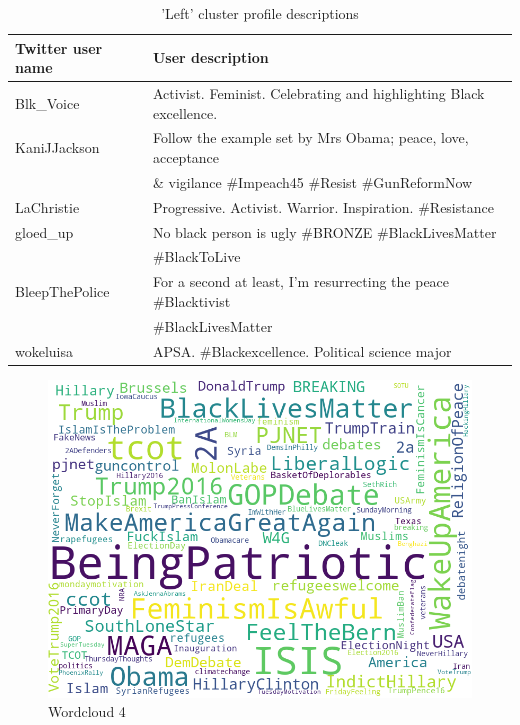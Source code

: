 \documentclass[12pt, authoryear]{elsarticle}
\begin{document}
\begin{center}
\begin{table}[H]
\begin{tabular}{ l l }
Twitter user name & User description \\
 \hline
Blk\_Voice & 	Activist. Feminist. Celebrating and highlighting Black excellence. \\
KaniJJackson &	Follow the example set by Mrs Obama; peace, love, acceptance \\
&  \& vigilance \#Impeach45 \#Resist \#GunReformNow \\
LaChristie	& Progressive. Activist. Warrior. Inspiration. \#Resistance \\
gloed\_up &	No black person is ugly \#BRONZE \#BlackLivesMatter \\
&  \#BlackToLive \\
BleepThePolice	 & For a second at least, I'm resurrecting the peace \#Blacktivist \\
& \#BlackLivesMatter \\
wokeluisa	& APSA. \#Blackexcellence. Political science major \\
 \hline
\end{tabular}
\caption{'Left' cluster profile descriptions}
\label{table:4}
\end{table}
\end{center}


\begin{figure}[H]
\includegraphics[width=5in]{wordcloud4}
\centering
\caption{Wordcloud 4}
\label{wordcloud:4}
\end{figure}
\end{document}
